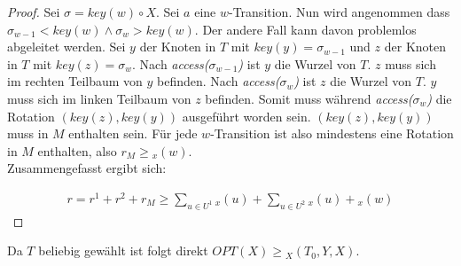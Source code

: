 \documentclass[a4paper,12pt]{article}
\begin{document}
\begin{proof}
Sei $\sigma = \mathit{key}(w) \circ X$. Sei $a$ eine $w$-Transition. Nun wird angenommen dass $\sigma_{w-1} < \mathit{key}(w)  \land \sigma_{w} > \mathit{key}(w)$. Der andere Fall kann davon problemlos abgeleitet werden. Sei $y$ der Knoten in $T$ mit $\mathit{key}(y) = \sigma_{w-1}$ und $z$ der Knoten in $T$ mit $\mathit{key}(z) = \sigma_{w}$. Nach \textit{access($\sigma_{w-1}$)} ist $y$ die Wurzel von $T$. $z$ muss sich im rechten Teilbaum von $y$ befinden. Nach  \textit{access($\sigma_{w}$)} ist $z$ die Wurzel von $T$. $y$ muss sich im linken Teilbaum von $z$ befinden. Somit muss während \textit{access($\sigma_{w}$)} die Rotation $(\mathit{key}(z),\mathit{key}(y))$ ausgeführt worden sein. $(\mathit{key}(z),\mathit{key}(y))$ muss in $M$ enthalten sein. Für jede $w$-Transition ist also mindestens eine Rotation in $M$ enthalten, also $r_M \geq  {_x} (w)$.\\
Zusammengefasst ergibt sich:

\begin{align*}
r = r^1 + r^2 + r_M \geq \sum_{u \in U^1} {_x} (u) + \sum_{u \in U^2} {_x} (u) +  {_x} (w)
\end{align*}



	
\end{proof}

\noindent Da $T$ beliebig gewählt ist folgt direkt $\mathit{OPT}\left(X\right) \geq {_X(T_0, Y, X)} $.  
\end{document}
